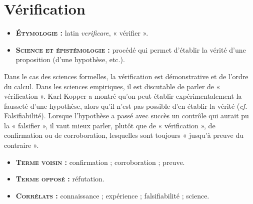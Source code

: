 
\chapter{Vérification}

\begin{itemize}[leftmargin=1cm, label=, itemsep=1pt]
\item {\bf \textsc{Étymologie} :} latin {\it verificare},
« vérifier ».
\item {\bf \textsc{Science et épistémologie} :} procédé
qui permet d'établir la vérité d'une proposition (d’une
hypothèse, etc.).
\end{itemize}

Dans le cas des sciences formelles, la
vérification est démonstrative et de
l'ordre du calcul. Dans les sciences
empiriques, il est discutable de parler de
« vérification ». Karl Kopper a montré
qu'on peut établir expérimentalement la
fausseté d’une hypothèse, alors qu'il
n'est pas possible d'en établir la vérité
({\it cf.} Falsifiabilité). Lorsque l'hypothèse a
passé avec succès un contrôle qui aurait
pu la « falsifier », il vaut mieux parler,
plutôt que de « vérification », de confirmation
ou de corroboration, lesquelles
sont toujours « jusqu'à preuve du
contraire ».

\begin{itemize}[leftmargin=1cm, label=, itemsep=1pt]
\item {\bf \textsc{Terme voisin} :} confirmation ;
corroboration ; preuve.
\item {\bf \textsc{Terme opposé} :} réfutation.
\item {\bf \textsc{Corrélats} :} connaissance ;
expérience ; falsifiabilité ; science.
\end{itemize}

